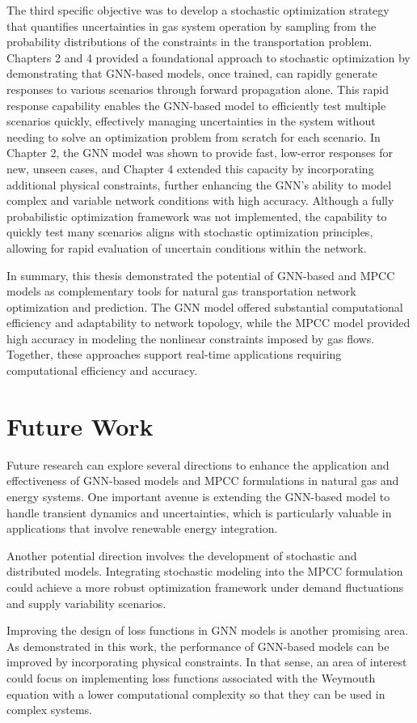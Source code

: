 The third specific objective was to develop a stochastic optimization strategy that quantifies uncertainties in gas system operation by sampling from the probability distributions of the constraints in the transportation problem. Chapters 2 and 4 provided a foundational approach to stochastic optimization by demonstrating that GNN-based models, once trained, can rapidly generate responses to various scenarios through forward propagation alone. This rapid response capability enables the GNN-based model to efficiently test multiple scenarios quickly, effectively managing uncertainties in the system without needing to solve an optimization problem from scratch for each scenario. In Chapter 2, the GNN model was shown to provide fast, low-error responses for new, unseen cases, and Chapter 4 extended this capacity by incorporating additional physical constraints, further enhancing the GNN's ability to model complex and variable network conditions with high accuracy. Although a fully probabilistic optimization framework was not implemented, the capability to quickly test many scenarios aligns with stochastic optimization principles, allowing for rapid evaluation of uncertain conditions within the network.

In summary, this thesis demonstrated the potential of GNN-based and MPCC models as complementary tools for natural gas transportation network optimization and prediction. The GNN model offered substantial computational efficiency and adaptability to network topology, while the MPCC model provided high accuracy in modeling the nonlinear constraints imposed by gas flows. Together, these approaches support real-time applications requiring computational efficiency and accuracy. 

\section{Future Work}

Future research can explore several directions to enhance the application and effectiveness of GNN-based models and MPCC formulations in natural gas and energy systems. One important avenue is extending the GNN-based model to handle transient dynamics and uncertainties, which is particularly valuable in applications that involve renewable energy integration. 

Another potential direction involves the development of stochastic and distributed models. Integrating stochastic modeling into the MPCC formulation could achieve a more robust optimization framework under demand fluctuations and supply variability scenarios. 

Improving the design of loss functions in GNN models is another promising area. As demonstrated in this work, the performance of GNN-based models can be improved by incorporating physical constraints.  In that sense, an area of interest could focus on implementing loss functions associated with the Weymouth equation with a lower computational complexity so that they can be used in complex systems. 

